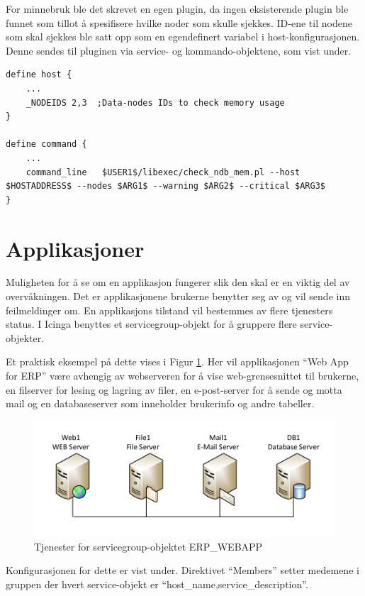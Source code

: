 For minnebruk ble det skrevet en egen plugin, da ingen eksisterende plugin ble funnet som tillot å spesifisere hvilke noder som skulle sjekkes. ID-ene til nodene som skal sjekkes ble satt opp som en egendefinert variabel i host-konfigurasjonen. Denne sendes til pluginen via service- og kommando-objektene, som vist under.

\begin{lstlisting}
define host {
	...
	_NODEIDS 2,3  ;Data-nodes IDs to check memory usage
}

define command {
	...
	command_line   $USER1$/libexec/check_ndb_mem.pl --host $HOSTADDRESS$ --nodes $ARG1$ --warning $ARG2$ --critical $ARG3$
}
\end{lstlisting}
\section{Applikasjoner}
Muligheten for å se om en applikasjon fungerer slik den skal er en viktig del av overvåkningen. Det er applikasjonene brukerne benytter seg av og vil sende inn feilmeldinger om. En applikasjons tilstand vil bestemmes av flere tjenesters status. I Icinga benyttes et servicegroup-objekt for å gruppere flere service-objekter.

Et praktisk eksempel på dette vises i Figur \ref{servicegroup_layout}. Her vil applikasjonen “Web App for ERP” være avhengig av webserveren for å vise web-grensesnittet til brukerne, en filserver for lesing og lagring av filer, en e-post-server for å sende og motta mail og en databaseserver som inneholder brukerinfo og andre tabeller. 

\begin{figure}
    \centering
    \includegraphics[scale=0.6]{img/servicegroup_layout}
    \caption{Tjenester for servicegroup-objektet  ERP\_WEBAPP}
    \label{servicegroup_layout}
\end{figure}


Konfigurasjonen for dette er vist under. Direktivet “Members” setter medemene i gruppen der hvert service-objekt er “host\_name,service\_description”.

